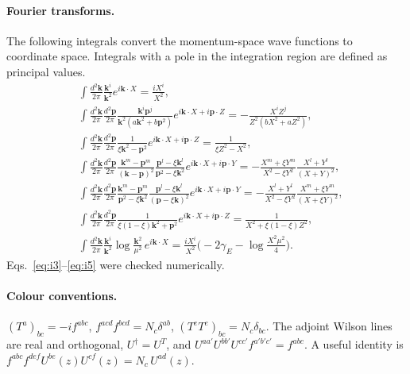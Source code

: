 \documentclass[aps,prd,onecolumn,superscriptaddress,nofootinbib,floatfix,longbibliography,11pt]{revtex4-2}
\numberwithin{equation}{section}
\begin{document}
\paragraph*{Fourier transforms.} The following integrals convert the momentum-space wave functions to coordinate space. Integrals with a pole in the integration region are defined as principal values.
\begin{align}
&\int\frac{d^2\mathbf k}{2\pi}\frac{\mathbf k^i}{\mathbf k^2}e^{i\mathbf k\cdot X}=\frac{iX^i}{X^2},\label{eq:i1}\\
&\int\frac{d^2\mathbf k}{2\pi}\frac{d^2\mathbf p}{2\pi}\frac{\mathbf k^i\mathbf p^j}{\mathbf k^2(a\mathbf k^2+b\mathbf p^2)}e^{i\mathbf k\cdot X+i\mathbf p\cdot Z}=-\frac{X^iZ^j}{Z^2(bX^2+aZ^2)},\label{eq:i2}\\
&\int\frac{d^2\mathbf k}{2\pi}\frac{d^2\mathbf p}{2\pi}\frac{1}{\xi\mathbf k^2-\mathbf p^2}e^{i\mathbf k\cdot X+i\mathbf p\cdot Z}=\frac{1}{\xi Z^2-X^2},\label{eq:i3}\\
&\int\frac{d^2\mathbf k}{2\pi}\frac{d^2\mathbf p}{2\pi}\frac{\mathbf k^m-\mathbf p^m}{(\mathbf k-\mathbf p)^2}\frac{\mathbf p^l-\xi\mathbf k^l}{\mathbf p^2-\xi\mathbf k^2}e^{i\mathbf k\cdot X+i\mathbf p\cdot Y}=-\frac{X^m+\xi Y^m}{X^2-\xi Y^2}\frac{X^l+Y^l}{(X+Y)^2},\label{eq:i4}\\
&\int\frac{d^2\mathbf k}{2\pi}\frac{d^2\mathbf p}{2\pi}\frac{\mathbf k^m-\mathbf p^m}{\mathbf p^2-\xi\mathbf k^2}\frac{\mathbf p^l-\xi\mathbf k^l}{(\mathbf p-\xi\mathbf k)^2}e^{i\mathbf k\cdot X+i\mathbf p\cdot Y}=-\frac{X^l+Y^l}{X^2-\xi Y^2}\frac{X^m+\xi Y^m}{(X+\xi Y)^2},\label{eq:i5}\\
&\int\frac{d^2\mathbf k}{2\pi}\frac{d^2\mathbf p}{2\pi}\frac{1}{\xi(1-\xi)\mathbf k^2+\mathbf p^2}e^{i\mathbf k\cdot X+i\mathbf p\cdot Z}=\frac{1}{X^2+\xi(1-\xi)Z^2},\label{eq:i7}\\
&\int\frac{d^2\mathbf k}{2\pi}\frac{\mathbf k^i}{\mathbf k^2}\log\frac{\mathbf k^2}{\mu^2}\,e^{i\mathbf k\cdot X}=\frac{iX^i}{X^2}\Big(-2\gamma_E-\log\frac{X^2\mu^2}{4}\Big).\label{eq:i9}
\end{align}
Eqs.~\eqref{eq:i3}--\eqref{eq:i5} were checked numerically.

\paragraph*{Colour conventions.} $(T^a)_{bc}=-if^{abc}$, $f^{acd}f^{bcd}=N_c\delta^{ab}$, $(T^eT^e)_{bc}=N_c\delta_{bc}$. The adjoint Wilson lines are real and orthogonal, $U^\dagger=U^T$, and $U^{aa'}U^{bb'}U^{cc'}f^{a'b'c'}=f^{abc}$. A useful identity is $f^{abc}f^{def}U^{be}(z)U^{cf}(z)=N_c\,U^{ad}(z)$.
\end{document}
